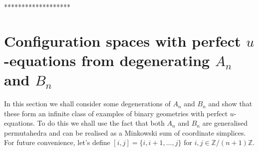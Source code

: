 \documentclass[hidelinks,12pt]{article}
\begin{document}
%


*******************

\newpage

\section{Configuration spaces with perfect $u$-equations from degenerating $A_n$ and $B_n$}
In this section we shall consider some degenerations of $A_n$ and $B_n$ and show that these form an infinite class of examples of binary geometries with perfect $u$-equations. To do this we shall use the fact that both $A_n$ and $B_n$ are generalised permutahedra and can be realised as a Minkowski sum of coordinate simplices. 
For future convenience, let's define $[i,j]=\{i,i+1,\dots,j\}$ for 
$i,j\in \mathbb Z/(n+1)\mathbb Z$.
\end{document}
